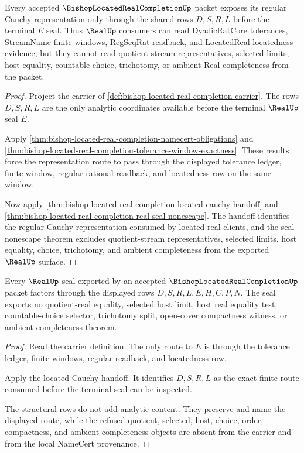 \begin{theorem}
\label{thm:located-real-completion-cauchy-representation}
Every accepted $\BishopLocatedRealCompletionUp$ packet exposes its regular Cauchy representation only through the shared rows $D,S,R,L$ before the terminal $E$ seal. Thus $\RealUp$ consumers can read DyadicRatCore tolerances, StreamName finite windows, RegSeqRat readback, and LocatedReal locatedness evidence, but they cannot read quotient-stream representatives, selected limits, host equality, countable choice, trichotomy, or ambient Real completeness from the packet.
\end{theorem}
\begin{proof}
Project the carrier of \autoref{def:bishop-located-real-completion-carrier}. The rows $D,S,R,L$ are the only analytic coordinates available before the terminal $\RealUp$ seal $E$.

Apply \autoref{thm:bishop-located-real-completion-namecert-obligations} and \autoref{thm:bishop-located-real-completion-tolerance-window-exactness}. These results force the representation route to pass through the displayed tolerance ledger, finite window, regular rational readback, and locatedness row on the same window.

Now apply \autoref{thm:bishop-located-real-completion-located-cauchy-handoff} and \autoref{thm:bishop-located-real-completion-real-seal-nonescape}. The handoff identifies the regular Cauchy representation consumed by located-real clients, and the seal nonescape theorem excludes quotient-stream representatives, selected limits, host equality, choice, trichotomy, and ambient completeness from the exported $\RealUp$ surface.
\end{proof}

\begin{theorem}
\label{thm:bishop-located-real-completion-real-seal-nonescape}
Every $\RealUp$ seal exported by an accepted $\BishopLocatedRealCompletionUp$ packet factors through the displayed rows $D,S,R,L,E,H,C,P,N$. The seal exports no quotient-real equality, selected host limit, host real equality test, countable-choice selector, trichotomy split, open-cover compactness witness, or ambient completeness theorem.
\end{theorem}
\begin{proof}
Read the carrier definition. The only route to $E$ is through the tolerance ledger, finite windows, regular readback, and locatedness row.

Apply the located Cauchy handoff. It identifies $D,S,R,L$ as the exact finite route consumed before the terminal seal can be inspected.

The structural rows do not add analytic content. They preserve and name the displayed route, while the refused quotient, selected, host, choice, order, compactness, and ambient-completeness objects are absent from the carrier and from the local NameCert provenance.
\end{proof}

